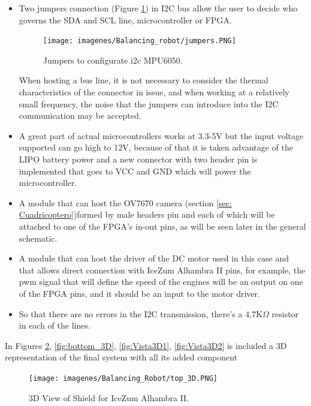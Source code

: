 \begin{itemize}
		\item Two jumpers connection (Figure \ref{fig:jumpers}) in I2C bus allow the user to decide who governs the SDA and SCL line, microcontroller or FPGA. 
		
		\begin{figure}[H]
			\center
			\texttt{[image: imagenes/Balancing\_robot/jumpers.PNG]}
			\caption{Jumpers to configurate i2c MPU6050.}
			\label{fig:jumpers}
		\end{figure}	
	
		When hosting a bus line, it is not necessary to consider the thermal characteristics of the connector in issue, and when working at a relatively small frequency, the noise that the jumpers can introduce into the I2C communication may be accepted.
		\item A great part of actual microcontrollers works at 3.3-5V but the input voltage supported can go high to 12V, because of that it is taken advantage of the LIPO battery power and a new connector with two header pin is implemented that goes to VCC and GND which will power the microcontroller.	
		\item A module that can host the OV7670 camera (section \ref{sec: Cuadricoptero})formed by male headers pin and each of which will be attached to one of the FPGA's in-out pins, as will be seen later in the general schematic.
		\item A module that can host the driver of the DC motor used in this case and that allows direct connection with IceZum Alhambra II pins, for example, the pwm signal that will define the speed of the engines will be an output on one of the FPGA pins, and it should be an input to the motor driver.
		
		\item So that there are no errors in the I2C transmission, there’s a 4,7K$\Omega$ resistor in each of the lines.
	\end{itemize}	
	In Figures \ref{fig:top_3D}, \ref{fig:bottom_3D}, \ref{fig:Vista3D1}, \ref{fig:Vista3D2} is included a 3D representation of the final system with all its added component
	
	\begin{center}
		\begin{figure}[H]
			\center
			\texttt{[image: imagenes/Balancing\_Robot/top\_3D.PNG]}
			\caption{3D View of Shield for IceZum Alhambra II.}
			\label{fig:top_3D}
		\end{figure}
	\end{center}
	
